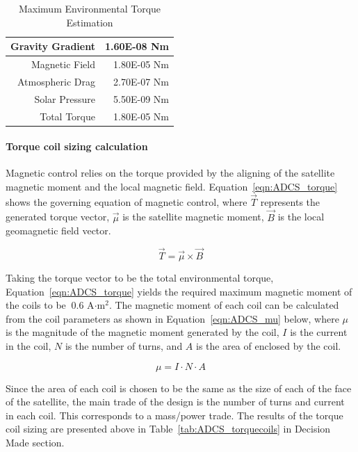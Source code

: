 \documentclass[12pt]{article}
\begin{document}
\begin{table}[htbp!]
  \centering
  \caption{Maximum Environmental Torque Estimation}
    \begin{tabular}{|r|r|}
    \hline
    Gravity Gradient & 1.60E-08 Nm \bigstrut\\
    \hline
    Magnetic Field & 1.80E-05 Nm \bigstrut\\
    \hline
    Atmospheric Drag & 2.70E-07 Nm \bigstrut\\
    \hline
    Solar Pressure & 5.50E-09 Nm \bigstrut\\
    \hline
    Total Torque & 1.80E-05 Nm \bigstrut\\
    \hline
    \end{tabular}%
  \label{tab:ADCS_envtorque}%
\end{table}%

			\paragraph{Torque coil sizing calculation}
			Magnetic control relies on the torque provided by the aligning of the satellite magnetic moment and the local magnetic field. Equation~\ref{eqn:ADCS_torque} shows the governing equation of magnetic control, where $\vec{T}$ represents the generated torque vector, $\vec{\mu}$ is the satellite magnetic moment, $\vec{B}$ is the local geomagnetic field vector. 
			
			\begin{equation}
				\vec{T} = \vec{\mu} \times \vec{B}
				\label{eqn:ADCS_torque}
			\end{equation}
			
			Taking the torque vector to be the total environmental torque, Equation~\ref{eqn:ADCS_torque} yields the required maximum magnetic moment of the coils to be $~ 0.6$ A$\cdot$m$^2$. The magnetic moment of each coil can be calculated from the coil parameters as shown in Equation~\ref{eqn:ADCS_mu} below, where $\mu$ is the magnitude of the magnetic moment generated by the coil, $I$ is the current in the coil, $N$ is the number of turns, and $A$ is the area of enclosed by the coil. 
			
			\begin{equation}
				\mu = I \cdot N \cdot A
				\label{eqn:ADCS_mu}
			\end{equation}
			
			Since the area of each coil is chosen to be the same as the size of each of the face of the satellite, the main trade of the design is the number of turns and current in each coil. This corresponds to a mass/power trade. The results of the torque coil sizing are presented above in Table~\ref{tab:ADCS_torquecoils} in Decision Made section. 
			
\end{document}
